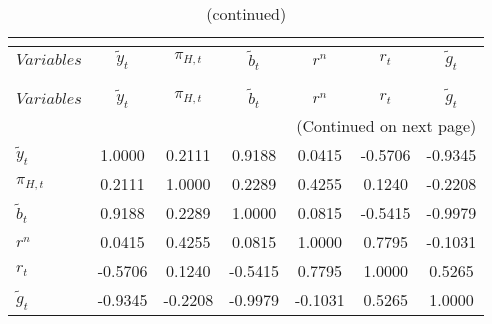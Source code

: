  
\begin{center}
\begin{longtable}{lcccccc} 
\caption{MATRIX OF CORRELATIONS}\\
 \label{Table:th_corr_matrix}\\
\toprule 
$Variables        $	 & 	 $   {\tilde{y}_{t}}$	 & 	 $       {\pi_{H,t}}$	 & 	 $     \tilde{b}_{t}$	 & 	 $            {r^{n}}$	 & 	 $            {r_{t}}$	 & 	 $     \tilde{g}_{t}$\\
\midrule \endfirsthead 
\caption{(continued)}\\
 \toprule \\ 
$Variables        $	 & 	 $   {\tilde{y}_{t}}$	 & 	 $       {\pi_{H,t}}$	 & 	 $     \tilde{b}_{t}$	 & 	 $            {r^{n}}$	 & 	 $            {r_{t}}$	 & 	 $     \tilde{g}_{t}$\\
\midrule \endhead 
\midrule \multicolumn{7}{r}{(Continued on next page)} \\ \bottomrule \endfoot 
\bottomrule \endlastfoot 
${\tilde{y}_{t}}  $	 & 	             1.0000	 & 	             0.2111	 & 	             0.9188	 & 	             0.0415	 & 	            -0.5706	 & 	            -0.9345 \\ 
${\pi_{H,t}}      $	 & 	             0.2111	 & 	             1.0000	 & 	             0.2289	 & 	             0.4255	 & 	             0.1240	 & 	            -0.2208 \\ 
$\tilde{b}_{t}    $	 & 	             0.9188	 & 	             0.2289	 & 	             1.0000	 & 	             0.0815	 & 	            -0.5415	 & 	            -0.9979 \\ 
${r^{n}}          $	 & 	             0.0415	 & 	             0.4255	 & 	             0.0815	 & 	             1.0000	 & 	             0.7795	 & 	            -0.1031 \\ 
${r_{t}}          $	 & 	            -0.5706	 & 	             0.1240	 & 	            -0.5415	 & 	             0.7795	 & 	             1.0000	 & 	             0.5265 \\ 
$\tilde{g}_{t}    $	 & 	            -0.9345	 & 	            -0.2208	 & 	            -0.9979	 & 	            -0.1031	 & 	             0.5265	 & 	             1.0000 \\ 
\end{longtable}
 \end{center}
